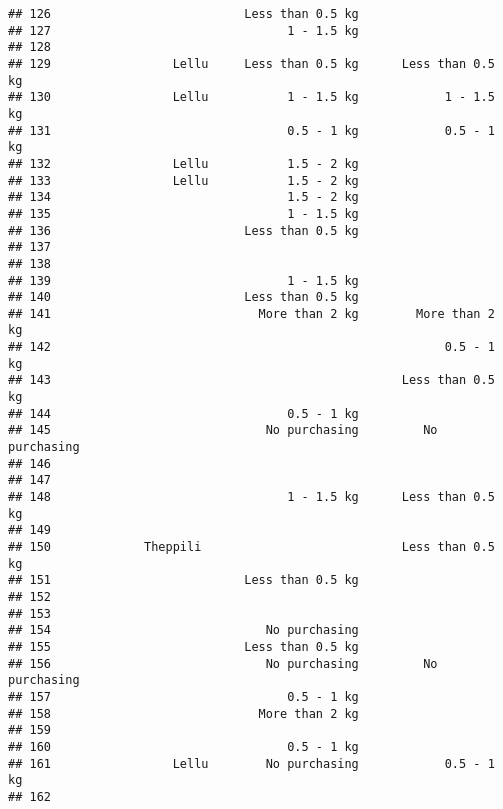 \documentclass[
]{article}
\begin{document}
\begin{verbatim}
## 126                           Less than 0.5 kg                      
## 127                                 1 - 1.5 kg                      
## 128                                                                 
## 129                 Lellu     Less than 0.5 kg      Less than 0.5 kg
## 130                 Lellu           1 - 1.5 kg            1 - 1.5 kg
## 131                                 0.5 - 1 kg            0.5 - 1 kg
## 132                 Lellu           1.5 - 2 kg                      
## 133                 Lellu           1.5 - 2 kg                      
## 134                                 1.5 - 2 kg                      
## 135                                 1 - 1.5 kg                      
## 136                           Less than 0.5 kg                      
## 137                                                                 
## 138                                                                 
## 139                                 1 - 1.5 kg                      
## 140                           Less than 0.5 kg                      
## 141                             More than 2 kg        More than 2 kg
## 142                                                       0.5 - 1 kg
## 143                                                 Less than 0.5 kg
## 144                                 0.5 - 1 kg                      
## 145                              No purchasing         No purchasing
## 146                                                                 
## 147                                                                 
## 148                                 1 - 1.5 kg      Less than 0.5 kg
## 149                                                                 
## 150             Theppili                            Less than 0.5 kg
## 151                           Less than 0.5 kg                      
## 152                                                                 
## 153                                                                 
## 154                              No purchasing                      
## 155                           Less than 0.5 kg                      
## 156                              No purchasing         No purchasing
## 157                                 0.5 - 1 kg                      
## 158                             More than 2 kg                      
## 159                                                                 
## 160                                 0.5 - 1 kg                      
## 161                 Lellu        No purchasing            0.5 - 1 kg
## 162                                                                 

\end{verbatim}
\end{document}
